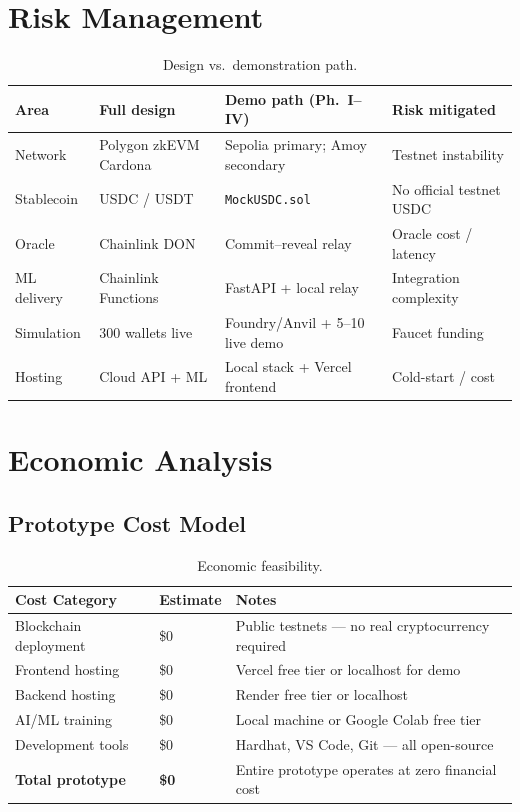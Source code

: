 \documentclass[12pt,a4paper]{report}
\newcommand{\tableheadcolor}{\rowcolor{TableHeadBg}}
\begin{document}
\section{Risk Management}
\label{sec:risk-management}
\label{sec:design-limitations}

\begin{table}[H]
\centering
\small
\caption[Design vs.\ demonstration path]{Design vs.\ demonstration path.}
\label{tab:design-vs-demo}
\label{tab:zero-cost-risks}
\begin{tabular}{@{}p{2.8cm}p{4.2cm}p{4.2cm}p{3.2cm}@{}}
\toprule
\tableheadcolor
\textbf{Area} & \textbf{Full design} & \textbf{Demo path (Ph.~I--IV)} & \textbf{Risk mitigated} \\
\midrule
Network & Polygon zkEVM Cardona & Sepolia primary; Amoy secondary & Testnet instability \\
Stablecoin & USDC / USDT & \texttt{MockUSDC.sol} & No official testnet USDC \\
Oracle & Chainlink DON & Commit--reveal relay & Oracle cost / latency \\
ML delivery & Chainlink Functions & FastAPI + local relay & Integration complexity \\
Simulation & 300 wallets live & Foundry/Anvil + 5--10 live demo & Faucet funding \\
Hosting & Cloud API + ML & Local stack + Vercel frontend & Cold-start / cost \\
\bottomrule
\end{tabular}
\end{table}

\section{Economic Analysis}
\label{sec:economic-analysis}

\subsection{Prototype Cost Model}
\label{sec:economic-feasibility}

\begin{table}[H]
\centering
\caption[Economic feasibility]{Economic feasibility.}
\label{tab:economic-feasibility}
\begin{tabular}{p{4cm}p{2.5cm}p{7cm}}
\toprule
\tableheadcolor
\textbf{Cost Category} & \textbf{Estimate} & \textbf{Notes} \\
\midrule
Blockchain deployment & \$0 & Public testnets --- no real cryptocurrency required \\
Frontend hosting & \$0 & Vercel free tier or localhost for demo \\
Backend hosting & \$0 & Render free tier or localhost \\
AI/ML training & \$0 & Local machine or Google Colab free tier \\
Development tools & \$0 & Hardhat, VS Code, Git --- all open-source \\
\textbf{Total prototype} & \textbf{\$0} & Entire prototype operates at zero financial cost \\
\bottomrule
\end{tabular}
\end{table}
\end{document}
